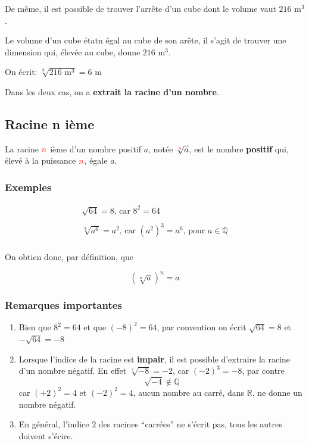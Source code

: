 \documentclass[
  12pt,
]{book}
\providecommand{\tightlist}{%
  \setlength{\itemsep}{0pt}\setlength{\parskip}{0pt}}
\begin{document}
De même, il est possible de trouver l'arrête d'un cube dont le volume vaut \(216\text{ m}^3\).

Le volume d'un cube étatn égal au cube de son arête, il s'agit de trouver une dimension qui, élevée au cube, donne \(216\text{ m}^3\).

On écrit: \(\sqrt[3]{216\text{ m}^3}=6\text{ m}\)

Dans les deux cas, on a \textbf{extrait la racine d'un nombre}.

\hypertarget{racine-n-iuxe8me}{%
\subsection{Racine n ième}\label{racine-n-iuxe8me}}

\begin{reglebox}
La racine \({\color{red}n}\) ième d'un nombre positif \(a\), notée \(\sqrt[{\color{red}n}]{a}\), est le nombre \textbf{positif} qui, élevé à la puissance \({\color{red}n}\), égale \(a\).

\end{reglebox}

\hypertarget{exemples-6}{%
\subsubsection{Exemples}\label{exemples-6}}

\begin{align*}
 \sqrt{64} = 8\text{, car }8^2 = 64\\
 \\
 \sqrt[3]{a^6} = a^2\text{, car }(a^2)^3 = a^6\text{, pour }a\in \mathbb{Q}\\
\end{align*}

On obtien donc, par définition, que

\[(\sqrt[n]{a})^n = a\]

\hypertarget{remarques-importantes}{%
\subsubsection{Remarques importantes}\label{remarques-importantes}}

\begin{enumerate}
\def\labelenumi{\arabic{enumi}.}
\tightlist
\item
  Bien que \(8^2=64\) et que \((-8)^2=64\), par convention on écrit \(\sqrt{64}=8\) et \(-\sqrt{64}=-8\)
\item
  Lorsque l'indice de la racine est \textbf{impair}, il est possible d'extraire la racine d'un nombre négatif. En effet \(\sqrt[3]{-8}=-2\), car \((-2)^3=-8\), par contre \[\sqrt{-4}\not\in\mathbb{Q}\] car \((+2)^2=4\) et \((-2)^2 = 4\), aucun nombre au carré, dans \(\mathbb{R}\), ne donne un nombre négatif.
\item
  En général, l'indice \(2\) des racines ``carrées'' ne s'écrit pas, tous les autres doivent s'écire.
\end{enumerate}
\end{document}
